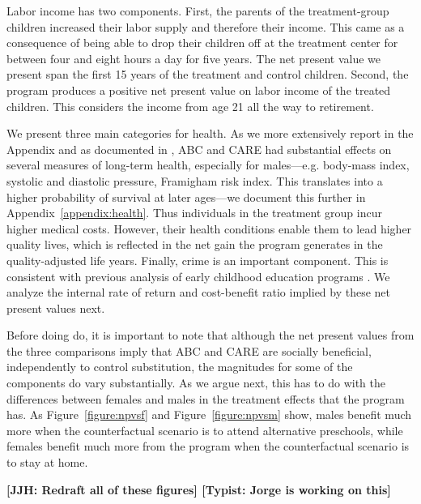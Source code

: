 Labor income has two components. First, the parents of the treatment-group children increased their labor supply and therefore their income. This came as a consequence of being able to drop their children off at the treatment center for between four and eight hours a day for five years. The net present value we present span the first 15 years of the treatment and control children. Second, the program produces a positive net present value on labor income of the treated children. This considers the income from age 21 all the way to retirement.

We present three main categories for health. As we more extensively report in the Appendix and as documented in \citet{Campbell_Conti_etal_2014_EarlyChildhoodInvestments}, ABC and CARE had substantial effects on several measures of long-term health, especially for males---e.g. body-mass index, systolic and diastolic pressure, Framigham risk index. This translates into a higher probability of survival at later ages---we document this further in Appendix~\ref{appendix:health}. Thus individuals in the treatment group incur higher medical costs. However, their health conditions enable them to lead higher quality lives, which is reflected in the net gain the program generates in the quality-adjusted life years. Finally, crime is an important component. This is consistent with previous analysis of early childhood education programs \citep{Heckman_Moon_etal_2010_RateofReturn}. We analyze the internal rate of return and cost-benefit ratio implied by these net present values next.

Before doing do, it is important to note that although the net present values from the three comparisons imply that ABC and CARE are socially beneficial, independently to control substitution, the magnitudes for some of the components do vary substantially. As we argue next, this has to do with the differences between females and males in the treatment effects that the program has. As Figure~\ref{figure:npvsf} and Figure~\ref{figure:npvsm} show, males benefit much more when the counterfactual scenario is to attend alternative preschools, while females benefit much more from the program when the counterfactual scenario is to stay at home.

\textbf{[JJH: Redraft all of these figures] [Typist: Jorge is working on this]}

